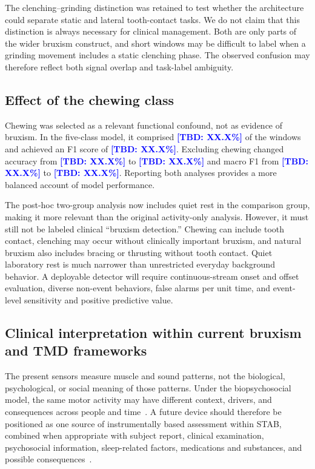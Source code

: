 \documentclass[pdflatex,sn-nature,iicol]{sn-jnl}
\newcommand{\TBD}[1]{\textcolor{blue}{\textbf{[TBD: #1]}}}
\begin{document}
\color{blue}
The clenching--grinding distinction was retained to test whether the architecture could separate static and lateral tooth-contact tasks. We do not claim that this distinction is always necessary for clinical management. Both are only parts of the wider bruxism construct, and short windows may be difficult to label when a grinding movement includes a static clenching phase. The observed confusion may therefore reflect both signal overlap and task-label ambiguity.
\color{black}

\color{blue}
\subsection{Effect of the chewing class}
\color{black}

\color{blue}
Chewing was selected as a relevant functional confound, not as evidence of bruxism. In the five-class model, it comprised \TBD{XX.X\%} of the windows and achieved an F1 score of \TBD{XX.X\%}. Excluding chewing changed accuracy from \TBD{XX.X\%} to \TBD{XX.X\%} and macro F1 from \TBD{XX.X\%} to \TBD{XX.X\%}. Reporting both analyses provides a more balanced account of model performance.
\color{black}

\color{blue}
The post-hoc two-group analysis now includes quiet rest in the comparison group, making it more relevant than the original activity-only analysis. However, it must still not be labeled clinical ``bruxism detection.'' Chewing can include tooth contact, clenching may occur without clinically important bruxism, and natural bruxism also includes bracing or thrusting without tooth contact. Quiet laboratory rest is much narrower than unrestricted everyday background behavior. A deployable detector will require continuous-stream onset and offset evaluation, diverse non-event behaviors, false alarms per unit time, and event-level sensitivity and positive predictive value.
\color{black}

\color{blue}
\subsection{Clinical interpretation within current bruxism and TMD frameworks}
\color{black}

\color{blue}
The present sensors measure muscle and sound patterns, not the biological, psychological, or social meaning of those patterns. Under the biopsychosocial model, the same motor activity may have different context, drivers, and consequences across people and time~\cite{manfredini2026biopsychosocial}. A future device should therefore be positioned as one source of instrumentally based assessment within STAB, combined when appropriate with subject report, clinical examination, psychosocial information, sleep-related factors, medications and substances, and possible consequences~\cite{manfredini2024standardised}.
\color{black}
\end{document}
